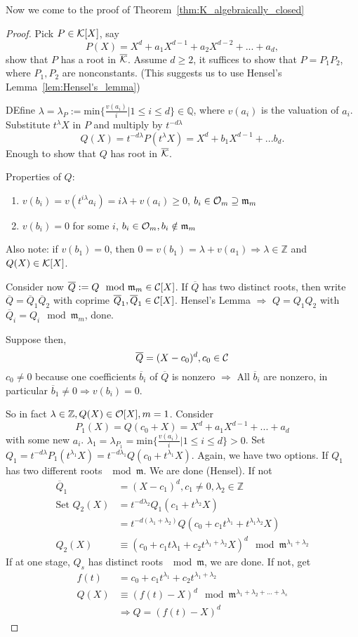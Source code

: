 \documentclass[11pt]{article}
\newcommand{\intg}{\mathbb Z}
\newcommand{\ratl}{\mathbb Q}
\newcommand{\scm}{{\mathfrak m}}
\newcommand{\calc}{{\cal C}}
\newcommand{\calk}{{\cal K}}
\newcommand{\calo}{{\cal O}}
\newcommand{\Lrta}{\Longrightarrow}
\begin{document}
Now we come to the proof of Theorem~\ref{thm:K_algebraically_closed}
\begin{proof}
Pick $P\in \calk[X]$, say 
$$
P(X)=X^d+a_1 X^{d-1}+a_2 X^{d-2}+...+a_d,
$$
show that $P$ has a root in $\overline{\calk}$. Assume $d\geq 2$, it suffices to show that $P=P_1P_2$, where $P_1, P_2$ are nonconstants. (This suggests us to use Hensel's Lemma~\ref{lem:Hensel's_lemma})

DEfine $\lambda=\lambda_P:=\text{min}\{\frac{v(a_i)}{i}|1\leq i\leq d\}\in \ratl$, where $v(a_i)$ is the valuation of $a_i$. Substitute $t^\lambda X$ in $P$ and multiply by $t^{-d\lambda}$
$$
Q(X)=t^{-d\lambda}P(t^{\lambda} X)=X^d+b_1 X^{d-1}+...b_d.
$$
Enough to show that $Q$ has root in $\overline{\calk}$.

Properties of $Q$:
\begin{enumerate}[label=(\arabic*)]
\item $v(b_i)=v(t^{i\lambda}a_i)=i\lambda+v(a_i)\geq 0$, $b_i\in \calo_m\supseteq \scm_m$
\item $v(b_i)=0$ for some $i$, $b_i\in \calo_m,b_i\notin\scm_m$
\end{enumerate}
Also note: if $v(b_1)=0$, then $0=v(b_1)=\lambda+v(a_1)\Lrta\lambda\in \intg$ and $Q(X)\in\calk[X]$.

Consider now $\overline{Q}:=Q\mod \scm_m\in\calc[X]$. If $\overline{Q}$ has two distinct roots, then write $\overline{Q}=\overline{Q}_1\overline{Q}_2$ with coprime $\overline{Q}_1,\overline{Q}_1\in\calc[X]$. Hensel's Lemma $\Lrta$ $Q=Q_1Q_2$ with $\overline{Q}_i=Q_i\mod \scm_m$, done.

Suppose then,
$$
\overline{Q}=(X-c_0)^d,c_0\in\calc
$$
$c_0\neq 0$ because one coefficients $\overline{b}_i$ of $\overline{Q}$ is nonzero $\Lrta$ All $\overline{b}_i$ are nonzero, in particular $\overline{b}_1\neq 0\Lrta v(b_i)=0$.

So in fact $\lambda\in\intg, Q(X)\in\calo[X],m=1$. Consider
$$
P_1(X)=Q(c_0+X)
=X^d+a_1 X^{d-1}+...+a_d
$$
with some new $a_i$.
$\lambda_1=\lambda_{P_1}=\text{min}\{\frac{v(a_i)}{i}|1\leq i\leq d\}>0$. Set $Q_1=t^{-d\lambda} P_1(t^{\lambda_1} X)=t^{-d\lambda_1}Q(c_0+t^{\lambda_1}X)$. Again, we have two options. If $Q_1$ has two different roots $\mod\scm$. We are done (Hensel).  If not
$$
\begin{aligned}
\overline{Q}_1&=(X-c_1)^d, c_1\neq 0,\lambda_2\in\intg\\
\text{Set }  Q_2(X)&=t^{-d\lambda_2} Q_1(c_1+t^{\lambda_2} X)\\
&= t^{-d(\lambda_1+\lambda_2)}Q(c_0+c_1t^{\lambda_1}+t^{\lambda_1\lambda_2} X)\\
Q_2(X)&\equiv (c_0+c_1 t{\lambda_1}+c_2 t^{\lambda_1+\lambda_2}X)^d
\mod \scm^{\lambda_1+\lambda_2}
\end{aligned}
$$
If at one stage, $Q_s$ has distinct roots $\mod\scm$, we are done. If not, get 
$$
\begin{aligned}
f(t)&=c_0+c_1 t^{\lambda_1}+c_2 t^{\lambda_1+\lambda_2}\\
Q(X)&\equiv (f(t)-X)^d\mod \scm^{\lambda_1+\lambda_2+...+\lambda_s}\\
&\Lrta Q=(f(t)-X)^d
\end{aligned}
$$
\end{proof}
\end{document}
